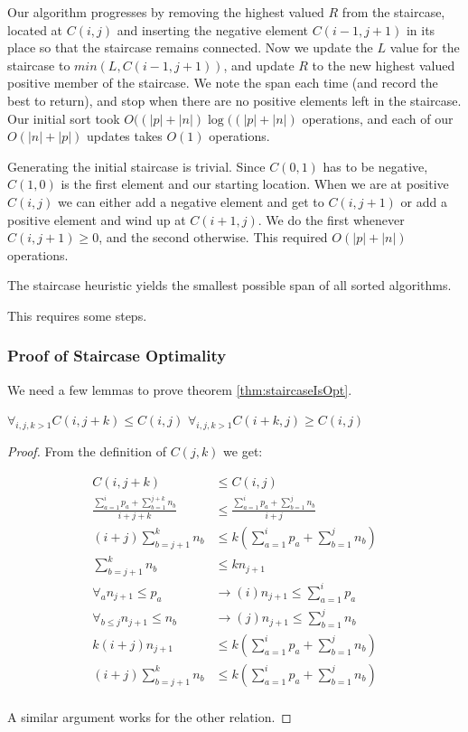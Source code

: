 Our algorithm progresses by removing the highest valued $R$ from the staircase, located at $C(i,j)$ and inserting the negative element $C(i-1,j+1)$ in its place so that the staircase remains connected.  Now we update the $L$ value for the staircase to $min(L,C(i-1,j+1) )$, and update $R$ to the new highest valued positive member of the staircase. We note the span each time (and record the best to return), and stop when there are no positive elements left in the staircase.  Our initial sort took $O( (|p|+|n|) \log ((|p|+|n| )$ operations, and each of our $O(|n|+|p|)$ updates takes $O(1)$ operations.

Generating the initial staircase is trivial. Since $C(0,1)$ has to be negative, $C(1,0)$ is the first element and our starting location.  When we are at positive $C(i,j)$ we can either add a negative element and get to $C(i,j+1)$ or add a positive element and wind up at $C(i+1,j)$. We do the first whenever $C(i,j+1) \geq 0$, and the second otherwise. This required $O(|p|+ |n|)$ operations.

\begin{thm}  \label{thm:staircaseIsOpt}
The staircase heuristic yields the smallest possible span of all sorted algorithms.
\end{thm}

This requires some steps.

\subsubsection{Proof of Staircase Optimality}

We need a few lemmas to prove theorem \ref{thm:staircaseIsOpt}.

\begin{lem} \label{lem:staircaseOrdering}
$\forall_{i,j,k>1} C(i,j+k) \leq C(i,j)$
$\forall_{i,j,k>1} C(i+k,j) \geq C(i,j)$
\end{lem}

\begin{proof}
From the definition of $C(j,k)$ we get:

\begin{align*}
C(i,j+k) &\leq C(i,j) \\
\frac{\sum_{a=1}^{i} p_a + \sum_{b=1}^{j+k} n_b }{i+j+k} &\leq \frac{\sum_{a=1}^{i} p_a + \sum_{b=1}^{j} n_b }{i+j} \\
(i+j)\sum_{b=j+1}^{k} n_b &\leq k(\sum_{a=1}^{i} p_a + \sum_{b=1}^{j} n_b) \\
\sum_{b=j+1}^{k} n_b &\leq k n_{j+1} \\
\forall_a n_{j+1} \leq p_a &\rightarrow (i) n_{j+1} \leq \sum_{a=1}^{i} p_a \\
\forall_{b\leq j} n_{j+1} \leq n_b &\rightarrow (j) n_{j+1} \leq \sum_{b=1}^{j} n_b \\
k(i+j)n_{j+1} &\leq k(\sum_{a=1}^{i} p_a + \sum_{b=1}^{j} n_b) \\  
(i+j)\sum_{b=j+1}^{k} n_b  &\leq k(\sum_{a=1}^{i} p_a + \sum_{b=1}^{j} n_b) \\  
\end{align*}

A similar argument works for the other relation.
\end{proof}

